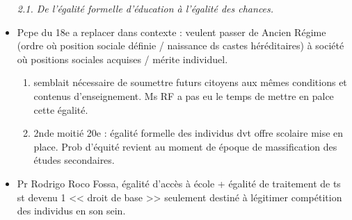 \documentclass[12pt]{report}
\begin{document}
\begin{itemize}
\textit{2.1. De l'égalité formelle d'éducation à l'égalité des chances.} \\

\item Pcpe du 18e a replacer dans contexte : veulent passer de Ancien Régime (ordre où position sociale définie / naissance ds castes héréditaires) à société où positions sociales acquises / mérite individuel.\\
\begin{enumerate}
\item semblait nécessaire de soumettre futurs citoyens aux mêmes conditions et contenus d'enseignement. Ms RF a pas eu le temps de mettre en palce cette égalité. \\
\item 2nde moitié 20e : égalité formelle des individus dvt offre scolaire mise en place. Prob d'équité revient au moment de époque de massification des études secondaires.\\
\end{enumerate}

\item Pr Rodrigo Roco Fossa, égalité d'accès à école + égalité de traitement de ts st devenu 1 << droit de base >> seulement destiné à légitimer compétition des individus en son sein.\\


\vspace{0.5cm}


\end{itemize}
\end{document}
